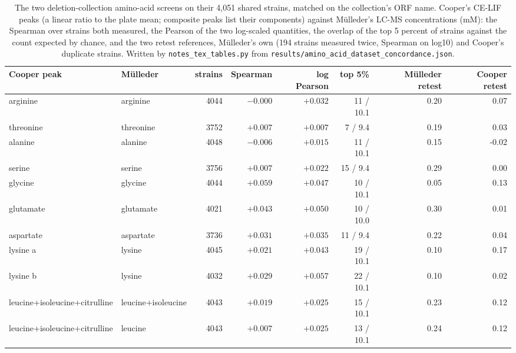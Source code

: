 \begin{table}[H]
  \centering
  \footnotesize
  \caption[M\"ulleder 2016 against Cooper 2010]{The two deletion-collection amino-acid screens on their 4,051 shared strains, matched on the collection's ORF name. Cooper's CE-LIF peaks (a linear ratio to the plate mean; composite peaks list their components) against M\"ulleder's LC-MS concentrations (mM): the Spearman over strains both measured, the Pearson of the two log-scaled quantities, the overlap of the top 5 percent of strains against the count expected by chance, and the two retest references, M\"ulleder's own (194 strains measured twice, Spearman on log10) and Cooper's duplicate strains. Written by \texttt{notes\_tex\_tables.py} from \texttt{results/amino\_acid\_dataset\_concordance.json}.}
  \label{tab:amino-acid-concordance}
  \begin{tabular}{@{}llrrrrrr@{}}
    \hline
    Cooper peak & M\"ulleder & strains & Spearman & log Pearson & top 5\% & M\"ulleder retest & Cooper retest \\
    \hline
    arginine & arginine & 4044 & $-0.000$ & $+0.032$ & 11 / 10.1 & 0.20 & 0.07 \\
    threonine & threonine & 3752 & $+0.007$ & $+0.007$ & 7 / 9.4 & 0.19 & 0.03 \\
    alanine & alanine & 4048 & $-0.006$ & $+0.015$ & 11 / 10.1 & 0.15 & -0.02 \\
    serine & serine & 3756 & $+0.007$ & $+0.022$ & 15 / 9.4 & 0.29 & 0.00 \\
    glycine & glycine & 4044 & $+0.059$ & $+0.047$ & 10 / 10.1 & 0.05 & 0.13 \\
    glutamate & glutamate & 4021 & $+0.043$ & $+0.050$ & 10 / 10.0 & 0.30 & 0.01 \\
    aspartate & aspartate & 3736 & $+0.031$ & $+0.035$ & 11 / 9.4 & 0.22 & 0.04 \\
    lysine a & lysine & 4045 & $+0.021$ & $+0.043$ & 19 / 10.1 & 0.10 & 0.17 \\
    lysine b & lysine & 4032 & $+0.029$ & $+0.057$ & 22 / 10.1 & 0.10 & 0.02 \\
    leucine+isoleucine+citrulline & leucine+isoleucine & 4043 & $+0.019$ & $+0.025$ & 15 / 10.1 & 0.23 & 0.12 \\
    leucine+isoleucine+citrulline & leucine & 4043 & $+0.007$ & $+0.025$ & 13 / 10.1 & 0.24 & 0.12 \\

\end{tabular}
\end{table}
